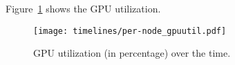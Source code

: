 Figure~\ref{fig:gpuutil} shows the GPU utilization.

\begin{figure}[ht]
\texttt{[image: timelines/per-node\_gpuutil.pdf]}
\caption{GPU utilization (in percentage) over the time.}\label{fig:gpuutil}
\end{figure}
